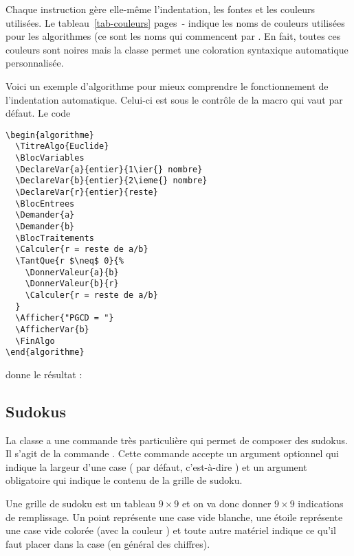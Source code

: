 \documentclass[nocrop]{sesamanuel}
\begin{document}
Chaque instruction gère elle-même l'indentation, les fontes et les
couleurs utilisées. Le tableau~\ref{tab-couleurs}
pages~\pageref{tab-debut-couleur}-\pageref{tab-couleurs} indique les noms de
couleurs utilisées pour les algorithmes (ce sont les noms qui
commencent par . En fait, toutes ces couleurs sont
noires mais la classe permet une coloration syntaxique automatique
personnalisée.

Voici un exemple d'algorithme pour mieux comprendre le fonctionnement
de l'indentation automatique. Celui-ci est sous le contrôle de la
macro  qui vaut \key{1em} par défaut. Le code
\begin{verbatim}
\begin{algorithme}
  \TitreAlgo{Euclide}
  \BlocVariables
  \DeclareVar{a}{entier}{1\ier{} nombre}
  \DeclareVar{b}{entier}{2\ieme{} nombre}
  \DeclareVar{r}{entier}{reste}
  \BlocEntrees
  \Demander{a}
  \Demander{b}
  \BlocTraitements
  \Calculer{r = reste de a/b}
  \TantQue{r $\neq$ 0}{%
    \DonnerValeur{a}{b}
    \DonnerValeur{b}{r}
    \Calculer{r = reste de a/b}
  }
  \Afficher{"PGCD = "}
  \AfficherVar{b}
  \FinAlgo
\end{algorithme}
\end{verbatim}
donne le résultat :
\begin{algorithme}
  \BlocVariables
  \BlocEntrees
  \BlocTraitements
  \FinAlgo
\end{algorithme}

\subsection{Sudokus}
La classe a une commande très particulière qui permet de composer
des sudokus. Il s'agit de la commande . Cette commande
accepte un argument optionnel qui indique la largeur d'une case
( par défaut, c'est-à-dire ) et un argument
obligatoire qui indique le contenu de la grille de sudoku.

Une grille de sudoku est un tableau $9\times9$ et on va donc
donner $9\times9$ indications de remplissage. Un point représente une
case vide blanche, une étoile représente une case vide colorée (avec
la couleur ) et toute autre matériel indique ce
qu'il faut placer dans la case (en général des chiffres).
\end{document}
